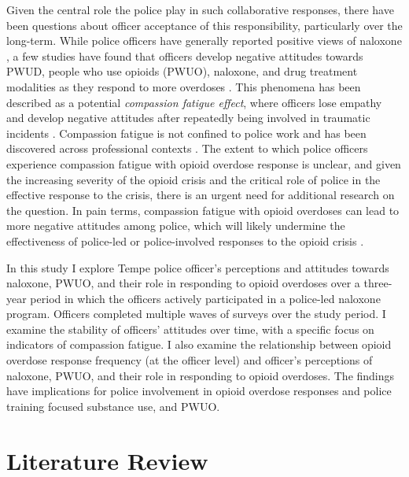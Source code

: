 Given the central role the police play in such collaborative responses, there have been questions about officer acceptance of this responsibility, particularly over the long-term. While police officers have generally reported positive views of naloxone \parencite{purviance_law_2017, pourtaher_naloxone_2022, wagner_training_2016, white_narcan_2021}, a few studies have found that officers develop negative attitudes towards PWUD, people who use opioids (PWUO), naloxone, and drug treatment modalities as they respond to more overdoses \parencite{carroll_knowledge_2020, murphy_police_2020, murphy_police_2021}. This phenomena has been described as a potential \textit{compassion fatigue effect}, where officers lose empathy and develop negative attitudes after repeatedly being involved in traumatic incidents \parencite{figley_compassion_1995, figley_treating_2002}. Compassion fatigue is not confined to police work and has been discovered across professional contexts \parencite{adams_compassion_2006}. The extent to which police officers experience compassion fatigue with opioid overdose response is unclear, and given the increasing severity of the opioid crisis and the critical role of police in the effective response to the crisis, there is an urgent need for additional research on the question. In pain terms, compassion fatigue with opioid overdoses can lead to more negative attitudes among police, which will likely undermine the effectiveness of police-led or police-involved responses to the opioid crisis \parencite{winstanley_bell_2020}.

In this study I explore Tempe police officer's perceptions and attitudes towards naloxone, PWUO, and their role in responding to opioid overdoses over a three-year period in which the officers actively participated in a police-led naloxone program. Officers completed multiple waves of surveys over the study period. I examine the stability of officers’ attitudes over time, with a specific focus on indicators of compassion fatigue. I also examine the relationship between opioid overdose response frequency (at the officer level) and officer's perceptions of naloxone, PWUO, and their role in responding to opioid overdoses. The findings have implications for police involvement in opioid overdose responses and police training focused substance use, and PWUO.

\section{\centering Literature Review}
